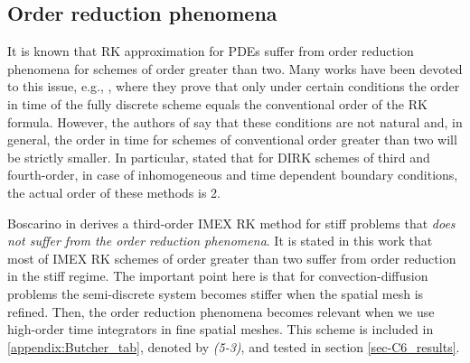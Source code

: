 \subsection{Order reduction phenomena}
\label{subsec-C6_order_reduction}
It is known that RK approximation for PDEs suffer from order reduction phenomena for schemes of order greater than two. Many works have been devoted to this issue, e.g., \cite{sanz-serna_convergence_1986,verwer_j._g._convergence_1986}, where they prove that only under certain conditions the order in time of the fully discrete scheme equals the conventional order of the RK formula. However, the authors of \cite{sanz-serna_convergence_1986,verwer_j._g._convergence_1986} say that these conditions are not natural and, in general, the order in time for schemes of conventional order greater than two will be strictly smaller. In particular, \cite{verwer_j._g._convergence_1986} stated that for DIRK schemes of third and fourth-order, in case of inhomogeneous and time dependent boundary conditions, the actual order of these methods is 2.

Boscarino in \cite{boscarino_accurate_2009} derives a third-order IMEX RK method for stiff problems that \emph{does not suffer from the order reduction phenomena}. It is stated in this work that most of IMEX RK schemes of order greater than two suffer from order reduction in the stiff regime. The important point here is that for convection-diffusion problems the semi-discrete system becomes stiffer when the spatial mesh is refined. Then, the order reduction phenomena becomes relevant when we use high-order time integrators in fine spatial meshes. This scheme is included in \ref{appendix:Butcher_tab}, denoted by \textit{(5-3)}, and tested in section \ref{sec-C6_results}.



